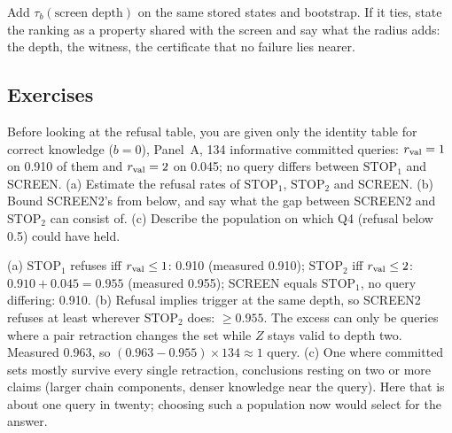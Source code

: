 \begin{noprato}
Add $\tau_b(\text{screen depth})$ on the same stored states and bootstrap. If it ties, state the
ranking as a property shared with the screen and say what the radius adds: the depth, the witness, the
certificate that no failure lies nearer.
\end{noprato}


\subsection*{Exercises}

\begin{exercicio}[metodo=estimation,conceito=regra-de-parada]
Before looking at the refusal table, you are given only the identity table for correct knowledge
($b = 0$), Panel~A, 134 informative committed queries: $r_{\mathrm{val}} = 1$ on 0.910 of them and $r_{\mathrm{val}} = 2$
on 0.045; no query differs between $\mathrm{STOP}_1$ and SCREEN. (a) Estimate the refusal rates of
$\mathrm{STOP}_1$, $\mathrm{STOP}_2$ and SCREEN. (b) Bound SCREEN2's from below, and say what the gap
between SCREEN2 and $\mathrm{STOP}_2$ can consist of. (c) Describe the population on which Q4
(refusal below 0.5) could have held.
\end{exercicio}
\begin{solucao}
(a) $\mathrm{STOP}_1$ refuses iff $r_{\mathrm{val}} \le 1$: 0.910 (measured 0.910); $\mathrm{STOP}_2$ iff
$r_{\mathrm{val}} \le 2$: $0.910 + 0.045 = 0.955$ (measured 0.955); SCREEN equals $\mathrm{STOP}_1$, no query
differing: 0.910. (b) Refusal implies trigger at the same depth, so SCREEN2 refuses at
least wherever $\mathrm{STOP}_2$ does: $\ge 0.955$. The excess can only be queries where a pair
retraction changes the set while $Z$ stays valid to depth two. Measured 0.963, so
$(0.963 - 0.955) \times 134 \approx 1$ query. (c) One where committed sets mostly survive every single
retraction, conclusions resting on two or more claims (larger chain components, denser knowledge near
the query). Here that is about one query in twenty; choosing such a population now would select for the
answer.
\end{solucao}

